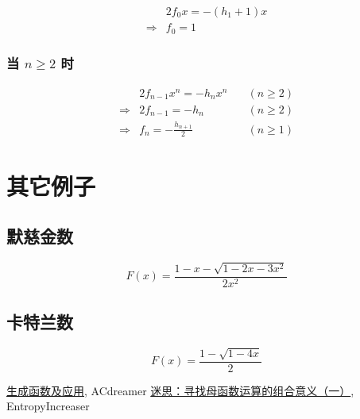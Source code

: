 \documentclass[UTF8]{article}
\begin{document}
$$
\begin{aligned}
    &2f_0x=-(h_1+1)x \\
    \Rightarrow & f_0=1
\end{aligned}
$$

\subsubsection{当 $n \ge 2$ 时}

$$
\begin{aligned}
    &2f_{n-1}x^n=-h_nx^n & \quad (n \ge 2) \\
    \Rightarrow & 2f_{n-1}=-h_n & \quad (n \ge 2) \\
    \Rightarrow & f_{n}=-\frac{h_{n+1}}{2}  & \quad (n \ge 1)
\end{aligned}
$$

\section{其它例子}

\subsection{默慈金数}

$$
F(x)=\frac{1-x-\sqrt{1-2x-3x^2}}{2x^2}
$$

\subsection{卡特兰数}

$$
F(x)=\frac{1-\sqrt{1-4x}}{2}
$$

\begin{thebibliography}{}
    \href{https://zhuanlan.zhihu.com/p/31457805}{生成函数及应用}, ACdreamer
    \href{https://zhuanlan.zhihu.com/p/54318231}{迷思：寻找母函数运算的组合意义（一）}, EntropyIncreaser
\end{thebibliography}
\end{document}
